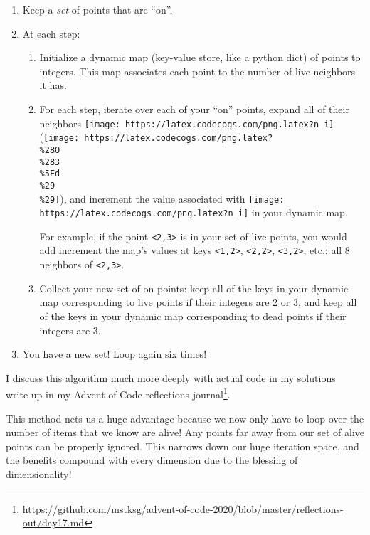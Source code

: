 \documentclass[]{article}
\renewcommand{\href}[2]{#2\footnote{\url{#1}}}
\begin{document}
\begin{enumerate}
\def\labelenumi{\arabic{enumi}.}
\tightlist
\item
  Keep a \emph{set} of points that are ``on''.
\item
  At each step:

  \begin{enumerate}
  \def\labelenumii{\alph{enumii}.}
  \item
    Initialize a dynamic map (key-value store, like a python dict) of points to
    integers. This map associates each point to the number of live neighbors it
    has.
  \item
    For each step, iterate over each of your ``on'' points, expand all of their
    neighbors \texttt{[image: https://latex.codecogs.com/png.latex?n\_i]}
    (\texttt{[image: https://latex.codecogs.com/png.latex?\\\%28O\\\%283\\\%5Ed\\\%29\\\%29]}),
    and increment the value associated with
    \texttt{[image: https://latex.codecogs.com/png.latex?n\_i]} in your dynamic
    map.

    For example, if the point \texttt{\textless{}2,3\textgreater{}} is in your
    set of live points, you would add increment the map's values at keys
    \texttt{\textless{}1,2\textgreater{}},
    \texttt{\textless{}2,2\textgreater{}},
    \texttt{\textless{}3,2\textgreater{}}, etc.: all 8 neighbors of
    \texttt{\textless{}2,3\textgreater{}}.
  \item
    Collect your new set of on points: keep all of the keys in your dynamic map
    corresponding to live points if their integers are 2 or 3, and keep all of
    the keys in your dynamic map corresponding to dead points if their integers
    are 3.
  \end{enumerate}
\item
  You have a new set! Loop again six times!
\end{enumerate}

I discuss this algorithm much more deeply with actual code in
\href{https://github.com/mstksg/advent-of-code-2020/blob/master/reflections-out/day17.md}{my
solutions write-up in my Advent of Code reflections journal}.

This method nets us a huge advantage because we now only have to loop over the
number of items that we know are alive! Any points far away from our set of
alive points can be properly ignored. This narrows down our huge iteration
space, and the benefits compound with every dimension due to the blessing of
dimensionality!
\end{document}
